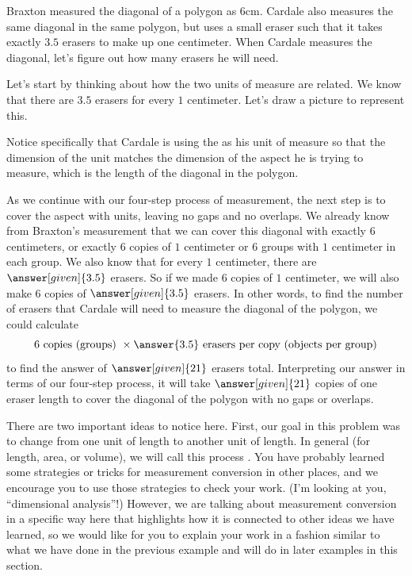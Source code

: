 \documentclass{ximera}
\begin{document}
\begin{example}
Braxton measured the diagonal of a polygon as $6$cm. Cardale also measures the same diagonal in the same polygon, but uses a small eraser such that it takes exactly $3.5$ erasers to make up one centimeter. When Cardale measures the diagonal, let's figure out how many erasers he will need.

Let's start by thinking about how the two units of measure are related. We know that there are $3.5$ erasers for every $1$ centimeter. Let's draw a picture to represent this.
\begin{image}
\end{image} 
Notice specifically that Cardale is using the 
 as his unit of measure so that the dimension of the unit matches the dimension of the aspect he is trying to measure, which is the length of the diagonal in the polygon.

As we continue with our four-step process of measurement, the next step is to cover the aspect with units, leaving no gaps and no overlaps. We already know from Braxton's measurement that we can cover this diagonal with exactly $6$ centimeters, or exactly $6$ copies of $1$ centimeter or $6$ groups with $1$ centimeter in each group. We also know that for every $1$ centimeter, there are $\answer[given]{3.5}$ erasers. So if we made $6$ copies of $1$ centimeter, we will also make $6$ copies of $\answer[given]{3.5}$ erasers. In other words, to find the number of erasers that Cardale will need to measure the diagonal of the polygon, we could calculate
\[
6 \textrm{ copies (groups) } \times \answer{3.5} \textrm{ erasers per copy (objects per group)}
\]
to find the answer of $\answer[given]{21}$ erasers total. Interpreting our answer in terms of our four-step process, it will take $\answer[given]{21}$ copies of one eraser length to cover the diagonal of the polygon with no gaps or overlaps.

\end{example}
There are two important ideas to notice here. First, our goal in this problem was to change from one unit of length to another unit of length. In general (for length, area, or volume), we will call this process . You have probably learned some strategies or tricks for measurement conversion in other places, and we encourage you to use those strategies to check your work. (I'm looking at you, ``dimensional analysis''!) However, we are talking about measurement conversion in a specific way here that highlights how it is connected to other ideas we have learned, so we would like for you to explain your work in a fashion similar to what we have done in the previous example and will do in later examples in this section.
\end{document}
